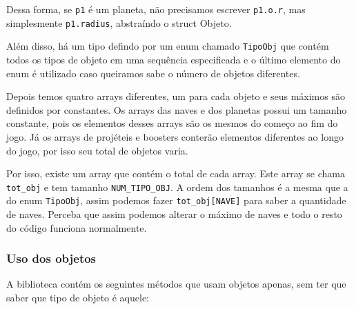 \documentclass[12pt, a4paper]{article}
\begin{document}
    Dessa forma, se \texttt{p1} é um planeta, não precisamos escrever
    \texttt{p1.o.r}, mas simplesmente \texttt{p1.radius}, abstraíndo o
    struct Objeto. 

    Além disso, há um tipo defindo por um enum chamado \texttt{TipoObj} que
    contém todos os tipos de objeto em uma sequência especificada e o último
    elemento do enum é utilizado caso queiramos sabe o número de objetos diferentes.

    Depois temos quatro arrays diferentes, um para cada objeto e seus máximos são
    definidos por constantes. Os arrays das naves e dos planetas possui um tamanho
    constante, pois os elementos desses arrays são os mesmos do começo ao fim 
    do jogo. Já os arrays de projéteis e boosters conterão elementos diferentes
    ao longo do jogo, por isso seu total de objetos varia.

    Por isso, existe um array que contém o total de cada array. Este array se chama
    \texttt{tot\_obj} e tem tamanho \texttt{NUM\_TIPO\_OBJ}. A ordem dos tamanhos
    é a mesma que a do enum \texttt{TipoObj}, assim podemos fazer 
    \texttt{tot\_obj[NAVE]} para saber a quantidade de naves. Perceba que assim 
    podemos alterar o máximo de naves e todo o resto do código funciona normalmente.

    \subsubsection{Uso dos objetos}

    A biblioteca contém os seguintes métodos que usam objetos apenas, sem ter
    que saber que tipo de objeto é aquele:
\end{document}
